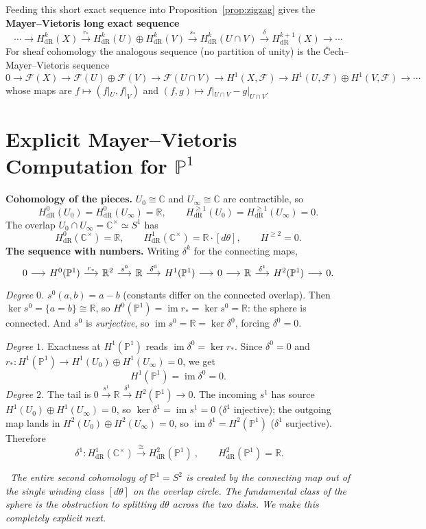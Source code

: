 \documentclass[11pt]{article}
\newcommand{\CC}{\mathbb C}
\newcommand{\RR}{\mathbb R}
\newcommand{\PP}{\mathbb P}
\newcommand{\FF}{\mathcal F}
\newcommand{\dR}{\mathrm{dR}}
\newcommand{\im}{\operatorname{im}}
\newcommand{\kerop}{\operatorname{ker}}
\newcommand{\diagnose}[1]{%
  \par\smallskip\noindent{\color{accent}\textbf{Diagnosis.}}\ \emph{#1}\par\smallskip}
\theoremstyle{plain}
\theoremstyle{definition}
\begin{document}
\noindent Feeding this short exact sequence into Proposition~\ref{prop:zigzag}
gives the \textbf{Mayer--Vietoris long exact sequence}
\[
  \cdots\to H^k_\dR(X)\xrightarrow{r_*}H^k_\dR(U)\oplus H^k_\dR(V)
  \xrightarrow{s_*}H^k_\dR(U\cap V)\xrightarrow{\ \delta\ }H^{k+1}_\dR(X)\to\cdots
\]
For sheaf cohomology the analogous sequence (no partition of unity) is the
\v Cech--Mayer--Vietoris sequence
\[
  0\to \FF(X)\to \FF(U)\oplus \FF(V)\to \FF(U\cap V)\to
  H^1(X,\FF)\to H^1(U,\FF)\oplus H^1(V,\FF)\to\cdots
\]
whose maps are $f\mapsto(f|_U,f|_V)$ and $(f,g)\mapsto f|_{U\cap V}-g|_{U\cap V}$.

\section{Explicit Mayer--Vietoris Computation for $\PP^1$}
\textbf{Cohomology of the pieces.} $U_0\cong\CC$ and $U_\infty\cong\CC$ are
contractible, so
\[
  H^0_\dR(U_0)=H^0_\dR(U_\infty)=\RR,\qquad H^{\ge1}_\dR(U_0)=H^{\ge1}_\dR(U_\infty)=0 .
\]
The overlap $U_0\cap U_\infty=\CC^\times\simeq S^1$ has
\[
  H^0_\dR(\CC^\times)=\RR,\qquad H^1_\dR(\CC^\times)=\RR\cdot[d\theta],\qquad H^{\ge2}=0 .
\]
\textbf{The sequence with numbers.} Writing $\delta^k$ for the connecting maps,
\[
\begin{tikzcd}[column sep=1.45em, row sep=0.3em]
0 \arrow[r] & H^0(\PP^1) \arrow[r,"r_*"] & \RR^2 \arrow[r,"s^0"] & \RR
   \arrow[r,"\delta^0"] & H^1(\PP^1) \arrow[r] & 0
   \arrow[r] & \RR \arrow[r,"\delta^1"] & H^2(\PP^1) \arrow[r] & 0 .
\end{tikzcd}
\]
\emph{Degree $0$.} $s^0(a,b)=a-b$ (constants differ on the connected overlap).
Then $\kerop s^0=\{a=b\}\cong\RR$, so $H^0(\PP^1)=\im r_*=\kerop s^0=\RR$: the
sphere is connected. And $s^0$ is \emph{surjective}, so $\im s^0=\RR=\kerop\delta^0$,
forcing $\delta^0=0$.

\emph{Degree $1$.} Exactness at $H^1(\PP^1)$ reads $\im\delta^0=\kerop r_*$. Since
$\delta^0=0$ and $r_*\colon H^1(\PP^1)\to H^1(U_0)\oplus H^1(U_\infty)=0$, we get
\[
  H^1(\PP^1)=\im\delta^0=0 .
\]
\emph{Degree $2$.} The tail is $0\xrightarrow{s^1}\RR\xrightarrow{\delta^1}H^2(\PP^1)\to0$.
The incoming $s^1$ has source $H^1(U_0)\oplus H^1(U_\infty)=0$, so $\kerop\delta^1
=\im s^1=0$ ($\delta^1$ injective); the outgoing map lands in
$H^2(U_0)\oplus H^2(U_\infty)=0$, so $\im\delta^1=H^2(\PP^1)$ ($\delta^1$
surjective). Therefore
\[
  \boxed{\ \delta^1\colon H^1_\dR(\CC^\times)\xrightarrow{\ \cong\ }H^2_\dR(\PP^1)\ },
  \qquad H^2_\dR(\PP^1)=\RR .
\]
\diagnose{The entire second cohomology of $\PP^1=S^2$ is \emph{created by the
connecting map} out of the single winding class $[d\theta]$ on the overlap
circle. The fundamental class of the sphere is the obstruction to splitting
$d\theta$ across the two disks. We make this completely explicit next.}
\end{document}

